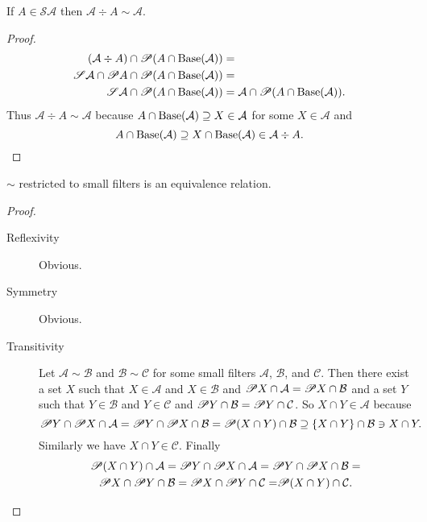 \begin{prop}\label{filteq-ext}
If $A\in\mathscr{S}\mathcal{A}$ then
$\mathcal{A}\div A\sim\mathcal{A}$.
\end{prop}
\begin{proof}
~
\begin{align*}
(\mathcal{A}\div A)\cap\mathscr{P}(A\cap\operatorname{Base}(\mathcal{A})) & =\\
\mathscr{S}\mathcal{A}\cap\mathscr{P} A\cap\mathscr{P}(A\cap\operatorname{Base}(\mathcal{A})) & =\\
\mathscr{S}\mathcal{A}\cap\mathscr{P}(A\cap\operatorname{Base}(\mathcal{A})) & =
\mathcal{A}\cap\mathscr{P}(A\cap\operatorname{Base}(\mathcal{A})).
\end{align*}
Thus $\mathcal{A}\div A\sim\mathcal{A}$ because $A\cap\operatorname{Base}(\mathcal{A})\supseteq X\in\mathcal{A}$
for some $X\in\mathcal{A}$ and 
\[
A\cap\operatorname{Base}(\mathcal{A})\supseteq X\cap\operatorname{Base}(\mathcal{A})\in\mathcal{A}\div A.
\]
\end{proof}

\begin{prop}
$\sim$ restricted to small filters is an equivalence relation.\end{prop}
\begin{proof}
~
\begin{description}
\item [{Reflexivity}] Obvious.
\item [{Symmetry}] Obvious.
\item [{Transitivity}] Let $\mathcal{A}\sim\mathcal{B}$ and $\mathcal{B}\sim\mathcal{C}$
for some small filters $\mathcal{A}$, $\mathcal{B}$, and $\mathcal{C}$.
Then there exist a set $X$ such that $X\in\mathcal{A}$ and $X\in\mathcal{B}$
and $\mathscr{P} X\cap\mathcal{A}=\mathscr{P} X\cap\mathcal{B}$ and a set
$Y$ such that $Y\in\mathcal{B}$ and $Y\in\mathcal{C}$ and $\mathscr{P} Y\cap\mathcal{B}=\mathscr{P} Y\cap\mathcal{C}$.
So $X\cap Y\in\mathcal{A}$ because
\[
\mathscr{P} Y\cap\mathscr{P} X\cap\mathcal{A}=\mathscr{P} Y\cap\mathscr{P} X\cap\mathcal{B}=\mathscr{P}(X\cap Y)\cap\mathcal{B}\supseteq\{X\cap Y\}\cap\mathcal{B}\ni X\cap Y.
\]
Similarly we have $X\cap Y\in\mathcal{C}$. Finally
\begin{multline*}
\mathscr{P}(X\cap Y)\cap\mathcal{A}=\mathscr{P} Y\cap\mathscr{P} X\cap\mathcal{A}=\mathscr{P} Y\cap\mathscr{P} X\cap\mathcal{B}=\\
\mathscr{P} X\cap\mathscr{P} Y\cap\mathcal{B}=\mathscr{P} X\cap\mathscr{P} Y\cap\mathcal{C=}\mathscr{P}(X\cap Y)\cap\mathcal{C}.
\end{multline*}

\end{description}
\end{proof}

